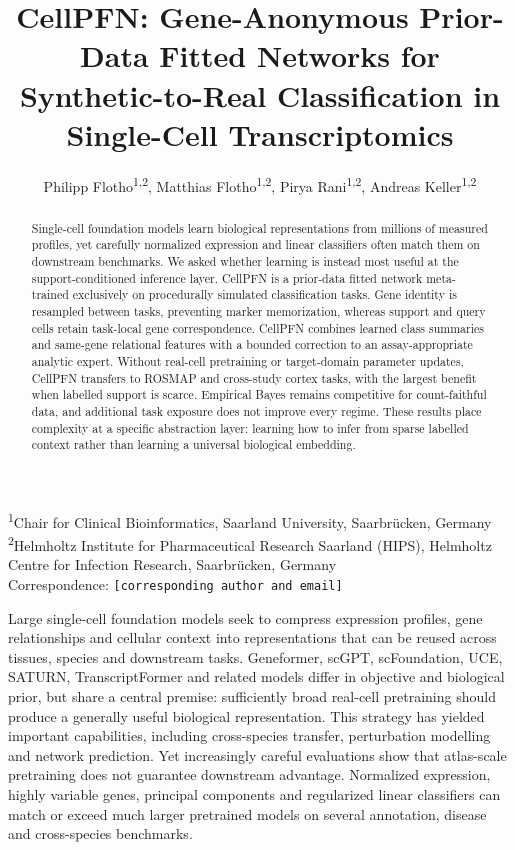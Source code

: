 \documentclass[12pt]{article}
\title{CellPFN: Gene-Anonymous Prior-Data Fitted Networks for Synthetic-to-Real Classification in Single-Cell Transcriptomics}
\author{
Philipp Flotho\textsuperscript{1,2},
Matthias Flotho\textsuperscript{1,2},
Pirya Rani\textsuperscript{1,2},
Andreas Keller\textsuperscript{1,2}
}
\date{}
\begin{document}
\maketitle

\begin{center}
\small
\textsuperscript{1}Chair for Clinical Bioinformatics, Saarland University, Saarbr\"ucken, Germany\\
\textsuperscript{2}Helmholtz Institute for Pharmaceutical Research Saarland (HIPS), Helmholtz Centre for Infection Research, Saarbr\"ucken, Germany\\
Correspondence: \texttt{[corresponding author and email]}
\end{center}

\begin{abstract}
Single-cell foundation models learn biological representations from millions of measured profiles, yet carefully normalized expression and linear classifiers often match them on downstream benchmarks. We asked whether learning is instead most useful at the support-conditioned inference layer. CellPFN is a prior-data fitted network meta-trained exclusively on procedurally simulated classification tasks. Gene identity is resampled between tasks, preventing marker memorization, whereas support and query cells retain task-local gene correspondence. CellPFN combines learned class summaries and same-gene relational features with a bounded correction to an assay-appropriate analytic expert. Without real-cell pretraining or target-domain parameter updates, CellPFN transfers to ROSMAP and cross-study cortex tasks, with the largest benefit when labelled support is scarce. Empirical Bayes remains competitive for count-faithful data, and additional task exposure does not improve every regime. These results place complexity at a specific abstraction layer: learning how to infer from sparse labelled context rather than learning a universal biological embedding.
\end{abstract}


Large single-cell foundation models seek to compress expression profiles, gene relationships and cellular context into representations that can be reused across tissues, species and downstream tasks. Geneformer, scGPT, scFoundation, UCE, SATURN, TranscriptFormer and related models differ in objective and biological prior, but share a central premise: sufficiently broad real-cell pretraining should produce a generally useful biological representation\cite{theodoris2023geneformer,cui2024scgpt,hao2024scfoundation,rosen2026uce,rosen2024saturn,pearce2025transcriptformer}. This strategy has yielded important capabilities, including cross-species transfer, perturbation modelling and network prediction. Yet increasingly careful evaluations show that atlas-scale pretraining does not guarantee downstream advantage. Normalized expression, highly variable genes, principal components and regularized linear classifiers can match or exceed much larger pretrained models on several annotation, disease and cross-species benchmarks\cite{souza2026parameterfree,boiarsky2024deeper,kedzierska2025zeroshot,ahlmann2025linear,denadel2026scaling,liu2026context}.
\end{document}
